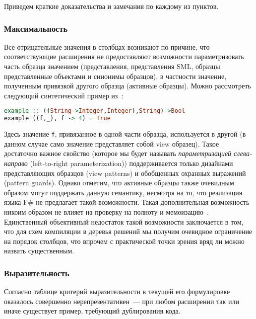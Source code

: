 Приведем краткие доказательства и замечания по каждому из \mbox{пунктов}.

\subsubsection{Максимальность}

Все отрицательные значения в столбцах возникают по причине, что соответствующие расширения не предоставляют возможности параметризовать часть образца значением (представления, представления SML, образцы представленные объектами и синонимы образцов), в частности значение, полученным привязкой другого образца (активные образцы). Можно рассмотреть следующий синтетический пример из~\cite{viewshaskell}:

\noindent
\begin{minipage}{\linewidth}
\begin{lstlisting}[language=haskell, escapechar=@]
example :: ((String->Integer,Integer),String)->Bool
example ((f,_), f -> 4) = True
\end{lstlisting}
\end{minipage}

Здесь значение \lstinline|f|, привязанное в одной части образца, используется в другой (в данном случае само значение представляет собой view образец). Такое достаточно важное свойство (которое мы будет называть \textit{параметризацией слева-направо} (left-to-right parameterization)) поддерживается только дизайнами представляющих образцов (view patterns) и обобщенных охранных выражений (pattern guards). Однако отметим, что активные образцы также очевидным образом могут поддержать данную семантику, несмотря на то, что реализация языка F\# не предлагает такой возможности. Такая дополнительная возможность никоим образом не влияет на проверку на полноту и мемоизацию~\cite{okasaki98views}. Единственный объективный недостаток такой возможности заключается в том, что для схем компиляции в деревья решений мы получим очевидное ограничение на порядок столбцов, что впрочем с практической точки зрения вряд ли можно назвать существенным.

\subsubsection{Выразительность}

Согласно таблице критерий выразительности в текущей его формулировке оказалось совершенно нерепрезентативен~--- при любом расширении так или иначе существует пример, требующий дублирования кода.

